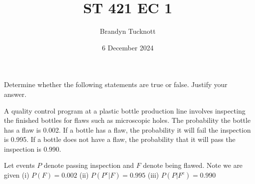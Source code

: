 \documentclass{exam}
\title{ST 421 EC 1}
\author{Brandyn Tucknott}
\date{6 December 2024}
\begin{document}
\maketitle

\begin{questions}
    \question
Determine whether the following statements are true or false. Justify your answer.


\newpage





\question
A quality control program at a plastic bottle production line involves inspecting the finished bottles for flaws such as microscopic holes. The probability the bottle has a flaw is 0.002. If a bottle has a flaw, the probability it will fail the inspection is 0.995. If a bottle does not have a flaw, the probability that it will pass the inspection is 0.990.

\newline
Let events $P$ denote passing inspection and $F$ denote being flawed. Note we are given
\newline
(i)   $P(F) = 0.002$
\newline
(ii)  $P(P^c | F) = 0.995$
\newline
(iii) $P(P | F^c) = 0.990$
\begin{parts}

\end{parts}
\end{questions}
\end{document}
